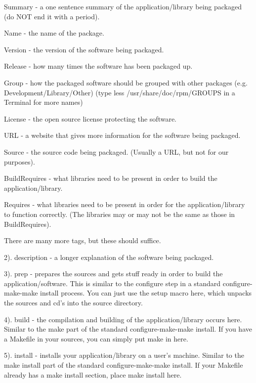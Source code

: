 {\ttfamily Summary} -\/ a one sentence summary of the application/library being packaged (do N\-O\-T end it with a period).

{\ttfamily Name} -\/ the name of the package.

{\ttfamily Version} -\/ the version of the software being packaged.

{\ttfamily Release} -\/ how many times the software has been packaged up.

{\ttfamily Group} -\/ how the packaged software should be grouped with other packages (e.\-g. Development/\-Library/\-Other) (type less /usr/share/doc/rpm/\-G\-R\-O\-U\-P\-S in a Terminal for more names)

{\ttfamily License} -\/ the open source license protecting the software.

{\ttfamily U\-R\-L} -\/ a website that gives more information for the software being packaged.

{\ttfamily Source} -\/ the source code being packaged. (Usually a U\-R\-L, but not for our purposes).

{\ttfamily Build\-Requires} -\/ what libraries need to be present in order to build the application/library.

{\ttfamily Requires} -\/ what libraries need to be present in order for the application/library to function correctly. (The libraries may or may not be the same as those in {\ttfamily Build\-Requires}).

There are many more tags, but these should suffice.

2). {\ttfamily description} -\/ a longer explanation of the software being packaged.

3). {\ttfamily prep} -\/ prepares the sources and gets stuff ready in order to build the application/software. This is similar to the configure step in a standard configure-\/make-\/make install process. You can just use the setup macro here, which unpacks the sources and cd's into the source directory.

4). {\ttfamily build} -\/ the compilation and building of the application/library occurs here. Similar to the make part of the standard configure-\/make-\/make install. If you have a Makefile in your sources, you can simply put make in here.

5). {\ttfamily install} -\/ installs your application/library on a user's machine. Similar to the make install part of the standard configure-\/make-\/make install. If your Makefile already has a make install section, place make install here.

